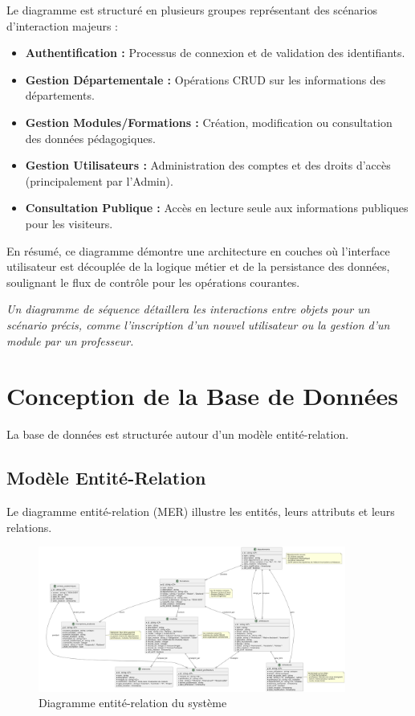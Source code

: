 Le diagramme est structuré en plusieurs groupes représentant des scénarios d'interaction majeurs :
\begin{itemize}
    \item \textbf{Authentification :} Processus de connexion et de validation des identifiants.
    \item \textbf{Gestion Départementale :} Opérations CRUD sur les informations des départements.
    \item \textbf{Gestion Modules/Formations :} Création, modification ou consultation des données pédagogiques.
    \item \textbf{Gestion Utilisateurs :} Administration des comptes et des droits d'accès (principalement par l'Admin).
    \item \textbf{Consultation Publique :} Accès en lecture seule aux informations publiques pour les visiteurs.
\end{itemize}
En résumé, ce diagramme démontre une architecture en couches où l'interface utilisateur est découplée de la logique métier et de la persistance des données, soulignant le flux de contrôle pour les opérations courantes.

\textit{Un diagramme de séquence détaillera les interactions entre objets pour un scénario précis, comme l'inscription d'un nouvel utilisateur ou la gestion d'un module par un professeur.}


\section{Conception de la Base de Données}
La base de données est structurée autour d'un modèle entité-relation.

\subsection{Modèle Entité-Relation}
Le diagramme entité-relation (MER) illustre les entités, leurs attributs et leurs relations.

\begin{figure}[H]
    \centering
    \includegraphics[width=0.9\textwidth]{diagrams/entities.png} %
    \caption{Diagramme entité-relation du système}
    \label{fig:er-diagram-condensed}
\end{figure}

